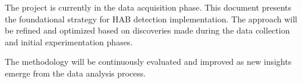 \documentclass[12pt]{article}
\begin{document}
The project is currently in the data acquisition phase. This document presents the foundational strategy for HAB detection implementation. The approach will be refined and optimized based on discoveries made during the data collection and initial experimentation phases.

The methodology will be continuously evaluated and improved as new insights emerge from the data analysis process.






 
\end{document}
